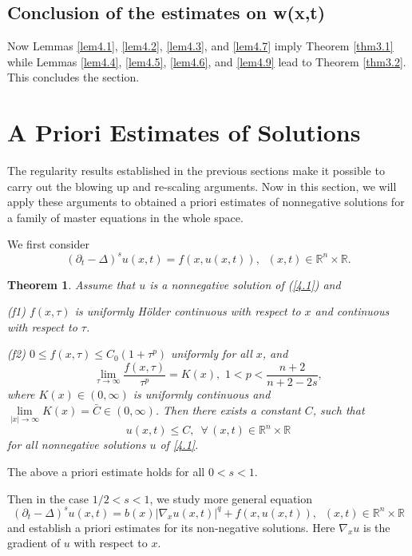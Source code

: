 \documentclass[12pt]{article}
\newtheorem{theorem}{Theorem}[section]
\theoremstyle{remark}
\numberwithin{equation}{section}
\begin{document}
\subsection{Conclusion of the estimates on w(x,t)}

Now Lemmas \ref{lem4.1}, \ref{lem4.2}, \ref{lem4.3}, and \ref{lem4.7} imply Theorem \ref{thm3.1} while Lemmas \ref{lem4.4}, \ref{lem4.5}, \ref{lem4.6}, and \ref{lem4.9} lead to Theorem \ref{thm3.2}. This concludes the section.

\section{A Priori Estimates of Solutions}

The regularity results established in the previous sections make it possible to carry out the blowing up and re-scaling arguments.
Now in this section, we will apply these arguments to obtained a priori estimates of nonnegative solutions for a family of master equations in the whole space.

We first consider
\begin{equation}
(\partial_t - \Delta)^s u(x,t) = f(x, u(x,t)), \;\; (x,t) \in \mathbb{R}^n \times \mathbb{R}.
\label{4.1}
\end{equation}

\begin{theorem} \label{thm4.1}
Assume that $u$ is a nonnegative solution of (\ref{4.1}) and

(f1) $f(x, \tau)$ is uniformly H\"{o}lder continuous with respect to $x$ and continuous  with respect to $\tau$.

 (f2) $0\leq f(x, \tau) \leq C_0(1+\tau^p)$  uniformly for all $x$, and
 $$
 \mathop{\lim}\limits_{\tau \to \infty}\frac{f(x, \tau)}{\tau^p}=K(x), \,\, 1<p<\frac{n+2}{n+2-2s},
 $$
 where $K(x)\in (0, \infty)$ is uniformly continuous and $ \mathop{\lim}\limits_{|x|\to \infty} K(x)=\bar C\in (0, \infty)$.
 Then there exists a constant $C$, such that
 \begin{equation} \label{4.2}
 u(x,t) \leq C, \,\,\, \forall \, (x,t) \in \mathbb{R}^n \times \mathbb{R}
 \end{equation}
 for all nonnegative solutions $u$ of \eqref{4.1}.
 \end{theorem}
 The above a priori estimate holds for all $0<s<1$.
 \medskip

Then in the case $1/2 <s <1$, we study more general equation
 \begin{equation} \label{4.2a}
 (\partial_t - \Delta)^s u(x,t) = b(x)|\nabla_x u(x,t)|^q + f(x, u(x,t)), \;\; (x,t) \in \mathbb{R}^n \times \mathbb{R}
 \end{equation}
 and establish a priori estimates for its non-negative solutions. Here $\nabla_x u$ is the gradient of $u$ with respect to $x$.
\end{document}
